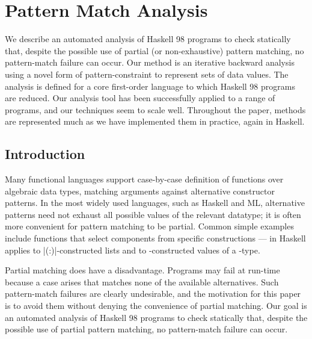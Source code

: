 

\chapter{Pattern Match Analysis}


We describe an automated analysis of Haskell 98 programs to check
statically that, despite the possible use of partial (or non-exhaustive)
pattern matching, no pattern-match failure can occur.  Our method is an
iterative backward analysis using a novel form of pattern-constraint
to represent sets of data values.  The analysis is defined for a
core first-order language to which Haskell 98 programs are reduced.
Our analysis tool has been successfully applied to a range of programs,
and our techniques seem to scale well.  Throughout the paper, methods
are represented much as we have implemented them in practice, again in Haskell.


\begin{comment}
\begin{code}
data Constraint = Constraint
\end{code}
\begin{code}
data Assert a = a :< Constraint
\end{code}
\begin{code}
infix  4  ==, /=
infixr 2  ||

(||) :: Bool -> Bool -> Bool
(==) :: Eq a => a -> a -> Bool
(/=) :: Eq a => a -> a -> Bool
map :: (a -> b) -> [a] -> [b]
\end{code}
\end{comment}

\section{Introduction}
\label{sec:introduction}

Many functional languages support case-by-case definition of functions
over algebraic data types, matching arguments against alternative
constructor patterns.  In the most widely used languages, such as Haskell
and ML, alternative patterns need not exhaust all possible values of
the relevant datatype; it is often more convenient for pattern matching
to be partial.  Common simple examples include functions that select
components from specific constructions --- in Haskell  applies
to |(:)|-constructed lists and  to -constructed values of
a -type.

Partial matching does have a disadvantage.  Programs may fail at run-time
because a case arises that matches none of the available alternatives.
Such pattern-match failures are clearly undesirable, and the motivation
for this paper is to avoid them without denying the convenience of
partial matching.  Our goal is an automated analysis of Haskell 98 programs
to check statically that, despite the possible use of partial pattern
matching, no pattern-match failure can occur.

